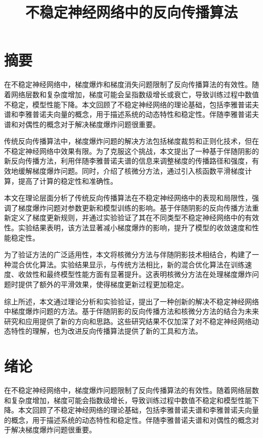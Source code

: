 \documentclass[12pt,a4paper]{amsart}
\title{不稳定神经网络中的反向传播算法}
\begin{document}
\maketitle

\section{摘要}

在不稳定神经网络中，梯度爆炸和梯度消失问题限制了反向传播算法的有效性。随着网络层数和复杂度增加，梯度可能会呈指数级增长或衰亡，导致训练过程中数值不稳定，模型性能下降。本文回顾了不稳定神经网络的理论基础，包括李雅普诺夫谱和李雅普诺夫向量的概念，用于描述系统的动态特性和稳定性。伴随李雅普诺夫谱和对偶性的概念对于解决梯度爆炸问题很重要。

传统反向传播算法中，梯度爆炸问题的解决方法包括梯度裁剪和正则化技术，但在不稳定神经网络中效果有限。为了克服这个挑战，本文提出了一种基于伴随阴影的新反向传播方法，利用伴随李雅普诺夫谱的信息来调整梯度的传播路径和强度，有效地缓解梯度爆炸问题。同时，介绍了核微分方法，通过引入核函数平滑梯度计算，提高了计算的稳定性和准确性。

本文在理论层面分析了传统反向传播算法在不稳定神经网络中的表现和局限性，强调了梯度爆炸问题对参数更新和模型训练的影响。基于伴随阴影的反向传播方法重新定义了梯度更新规则，并通过实验验证了其在不同类型不稳定神经网络中的有效性。实验结果表明，该方法显著减小梯度爆炸的影响，提升了模型的收敛速度和性能稳定性。

为了验证方法的广泛适用性，本文将核微分方法与伴随阴影技术相结合，构建了一种混合优化算法。实验结果显示，与传统方法相比，新的混合优化算法在训练速度、收敛性和最终模型性能方面有显著提升。这表明核微分方法在处理梯度爆炸问题时提供了额外的平滑效果，使得梯度更新过程更加稳定。

综上所述，本文通过理论分析和实验验证，提出了一种创新的解决不稳定神经网络中梯度爆炸问题的方法。基于伴随阴影的反向传播方法和核微分方法的结合为未来研究和应用提供了新的方向和思路。这些研究结果不仅加深了对不稳定神经网络动态特性的理解，也为改进反向传播算法提供了新的工具和方法。

\section{绪论}

在不稳定神经网络中，梯度爆炸问题限制了反向传播算法的有效性。随着网络层数和复杂度增加，梯度可能会指数级增长，导致训练过程中数值不稳定和模型性能下降。本文回顾了不稳定神经网络的理论基础，包括李雅普诺夫谱和李雅普诺夫向量的概念，用于描述系统的动态特性和稳定性。伴随李雅普诺夫谱和对偶性的概念对于解决梯度爆炸问题很重要。\\
\end{document}
